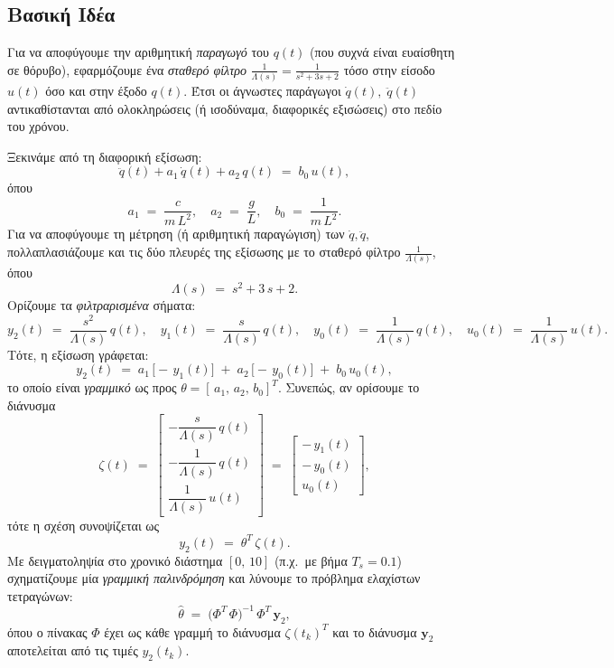 \documentclass[a4paper,12pt]{report}
\begin{document}
\subsection*{Βασική Ιδέα}

Για να αποφύγουμε την αριθμητική \emph{παραγωγό} του $q(t)$ (που συχνά είναι 
ευαίσθητη σε θόρυβο), εφαρμόζουμε ένα \emph{σταθερό φίλτρο} 
$\tfrac{1}{\Lambda(s)} = \tfrac{1}{s^2+3s+2}$ τόσο στην είσοδο $u(t)$ 
όσο και στην έξοδο $q(t)$. Έτσι οι άγνωστες παράγωγοι $\dot{q}(t),\;\ddot{q}(t)$ 
αντικαθίστανται από ολοκληρώσεις (ή ισοδύναμα, διαφορικές εξισώσεις) στο πεδίο του χρόνου. 

\vspace{0.4cm}

\hspace{-0.6cm}Ξεκινάμε από τη διαφορική εξίσωση:
\[
\ddot{q}(t) + a_{1}\,\dot{q}(t) + a_{2}\,q(t)
\;=\;
b_{0}\,u(t),
\]
όπου
\[
a_{1} \;=\;\frac{c}{m\,L^{2}},
\quad
a_{2} \;=\;\frac{g}{L},
\quad
b_{0} \;=\;\frac{1}{m\,L^{2}}.
\]
Για να αποφύγουμε τη μέτρηση (ή αριθμητική παραγώγιση) των \(\dot{q},\ddot{q}\),
πολλαπλασιάζουμε και τις δύο πλευρές της εξίσωσης με το σταθερό φίλτρο
\(\tfrac{1}{\Lambda(s)}\), όπου
\[
\Lambda(s) \;=\; s^2 + 3\,s + 2.
\]
Ορίζουμε τα \emph{φιλτραρισμένα} σήματα:
\[
y_{2}(t) \;=\;\frac{s^2}{\Lambda(s)}\,q(t),
\quad
y_{1}(t) \;=\;\frac{s}{\Lambda(s)}\,q(t),
\quad
y_{0}(t) \;=\;\frac{1}{\Lambda(s)}\,q(t),
\quad
u_{0}(t) \;=\;\frac{1}{\Lambda(s)}\,u(t).
\]
Τότε, η εξίσωση γράφεται:
\[
y_{2}(t)
\;=\;
a_{1}\,\bigl[-\,y_{1}(t)\bigr]
\;+\;
a_{2}\,\bigl[-\,y_{0}(t)\bigr]
\;+\;
b_{0}\,u_{0}(t),
\]
το οποίο είναι \emph{γραμμικό} ως προς \(\theta = [\,a_{1},\,a_{2},\,b_{0}]^T\).
Συνεπώς, αν ορίσουμε το διάνυσμα
\[
\zeta(t) \;=\;
\begin{bmatrix}
-\dfrac{s}{\Lambda(s)}\,q(t)
\\[6pt]
-\dfrac{1}{\Lambda(s)}\,q(t)
\\[6pt]
\dfrac{1}{\Lambda(s)}\,u(t)
\end{bmatrix}
\;=\;
\begin{bmatrix}
-\,y_{1}(t)
\\[3pt]
-\,y_{0}(t)
\\[3pt]
u_{0}(t)
\end{bmatrix},
\]
τότε η σχέση συνοψίζεται ως
\[
y_{2}(t) \;=\;\theta^{T}\,\zeta(t).
\]
Με δειγματοληψία στο χρονικό διάστημα \([0,\,10]\) (π.χ.\ με βήμα
\(T_{s}=0.1\)) σχηματίζουμε μία \emph{γραμμική παλινδρόμηση} και λύνουμε το
πρόβλημα ελαχίστων τετραγώνων:
\[
\hat{\theta}
\;=\;
\bigl(\Phi^{T}\,\Phi\bigr)^{-1}\,\Phi^{T}\,\mathbf{y}_{2},
\]
όπου ο πίνακας \(\Phi\) έχει ως κάθε γραμμή το διάνυσμα \(\zeta(t_k)^T\) και το διάνυσμα \(\mathbf{y}_2\) αποτελείται από τις τιμές \(y_2(t_k)\).
\end{document}
